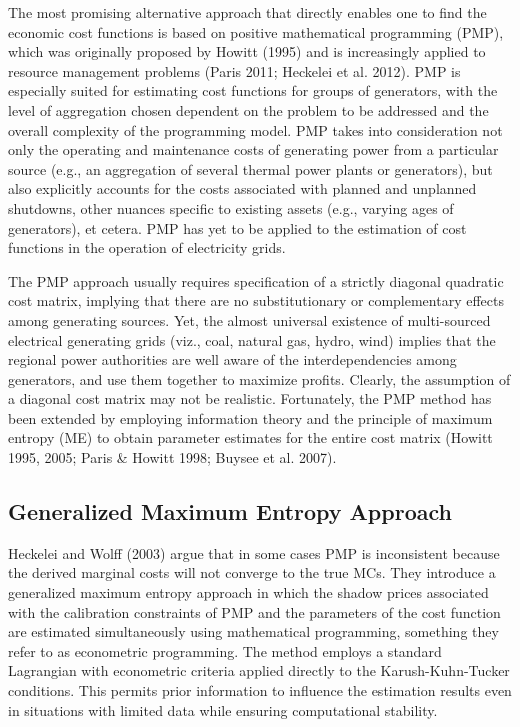 The most promising alternative approach that directly enables one to
find the economic cost functions is based on positive mathematical
programming (PMP), which was originally proposed by Howitt (1995) and is
increasingly applied to resource management problems (Paris 2011;
Heckelei et al. 2012). PMP is especially suited for estimating cost
functions for groups of generators, with the level of aggregation chosen
dependent on the problem to be addressed and the overall complexity of
the programming model. PMP takes into consideration not only the
operating and maintenance costs of generating power from a particular
source (e.g., an aggregation of several thermal power plants or
generators), but also explicitly accounts for the costs associated with
planned and unplanned shutdowns, other nuances specific to existing
assets (e.g., varying ages of generators), et cetera. PMP has yet to be
applied to the estimation of cost functions in the operation of
electricity grids.

The PMP approach usually requires specification of a strictly diagonal
quadratic cost matrix, implying that there are no substitutionary or
complementary effects among generating sources. Yet, the almost
universal existence of multi-sourced electrical generating grids (viz.,
coal, natural gas, hydro, wind) implies that the regional power
authorities are well aware of the interdependencies among generators,
and use them together to maximize profits. Clearly, the assumption of a
diagonal cost matrix may not be realistic. Fortunately, the PMP method
has been extended by employing information theory and the principle of
maximum entropy (ME) to obtain parameter estimates for the entire cost
matrix (Howitt 1995, 2005; Paris \& Howitt 1998; Buysee et al. 2007).

\subsection{Generalized Maximum Entropy
Approach}\label{generalized-maximum-entropy-approach}

Heckelei and Wolff (2003) argue that in some cases PMP is inconsistent
because the derived marginal costs will not converge to the true MCs.
They introduce a generalized maximum entropy approach in which the
shadow prices associated with the calibration constraints of PMP and the
parameters of the cost function are estimated simultaneously using
mathematical programming, something they refer to as econometric
programming. The method employs a standard Lagrangian with econometric
criteria applied directly to the Karush-Kuhn-Tucker conditions. This
permits prior information to influence the estimation results even in
situations with limited data while ensuring computational stability.

